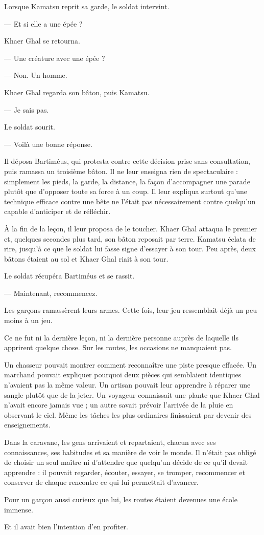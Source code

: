 Lorsque Kamatsu reprit sa garde, le soldat intervint.

— Et si elle a une épée ?

Khaer Ghal se retourna.

— Une créature avec une épée ?

— Non. Un homme.

Khaer Ghal regarda son bâton, puis Kamatsu.

— Je sais pas.

Le soldat sourit.

— Voilà une bonne réponse.

Il déposa Bartiméus, qui protesta contre cette décision prise sans consultation,
puis ramassa un troisième bâton. Il ne leur enseigna rien de spectaculaire :
simplement les pieds, la garde, la distance, la façon d'accompagner une parade
plutôt que d'opposer toute sa force à un coup. Il leur expliqua surtout qu'une
technique efficace contre une bête ne l'était pas nécessairement contre
quelqu'un capable d'anticiper et de réfléchir.

À la fin de la leçon, il leur proposa de le toucher. Khaer Ghal attaqua le
premier et, quelques secondes plus tard, son bâton reposait par terre. Kamatsu
éclata de rire, jusqu'à ce que le soldat lui fasse signe d'essayer à son tour.
Peu après, deux bâtons étaient au sol et Khaer Ghal riait à son tour.

Le soldat récupéra Bartiméus et se rassit.

— Maintenant, recommencez.

Les garçons ramassèrent leurs armes. Cette fois, leur jeu ressemblait déjà un
peu moins à un jeu.

\scenebreak

Ce ne fut ni la dernière leçon, ni la dernière personne auprès de laquelle ils
apprirent quelque chose. Sur les routes, les occasions ne manquaient pas.

Un chasseur pouvait montrer comment reconnaître une piste presque effacée. Un
marchand pouvait expliquer pourquoi deux pièces qui semblaient identiques
n'avaient pas la même valeur. Un artisan pouvait leur apprendre à réparer une
sangle plutôt que de la jeter. Un voyageur connaissait une plante que Khaer
Ghal n'avait encore jamais vue ; un autre savait prévoir l'arrivée de la pluie
en observant le ciel. Même les tâches les plus ordinaires finissaient par
devenir des enseignements.

Dans la caravane, les gens
arrivaient et repartaient, chacun avec ses connaissances, ses habitudes et sa
manière de voir le monde. Il n'était pas obligé de choisir un seul maître ni
d'attendre que quelqu'un décide de ce qu'il devait apprendre : il pouvait
regarder, écouter, essayer, se tromper, recommencer et conserver de chaque
rencontre ce qui lui permettait d'avancer.

Pour un garçon aussi curieux que lui, les routes étaient devenues une école
immense.

Et il avait bien l'intention d'en profiter.